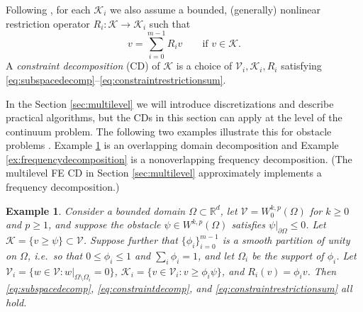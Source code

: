 \documentclass[letterpaper,final,12pt,reqno]{amsart}
\theoremstyle{cstyle}
\theoremstyle{cstyle*}
\theoremstyle{dstyle}
\newtheorem{example}[theorem]{Example}
\numberwithin{equation}{section}
\numberwithin{figure}{section}
\numberwithin{table}{section}
\numberwithin{theorem}{section}
\newcommand{\RR}{\mathbb{R}}
\newcommand{\cK}{\mathcal{K}}
\newcommand{\cV}{\mathcal{V}}
\begin{document}
Following \cite{Tai2003}, for each $\cK_i$ we also assume a bounded, (generally) nonlinear restriction operator $R_i : \cK \to \cK_i$ such that
\begin{equation}
v = \sum_{i=0}^{m-1} R_i v \qquad \text{if } v \in \cK.  \label{eq:constraintrestrictionsum}
\end{equation}
A \emph{constraint decomposition} (CD) of $\cK$ is a choice of $\cV_i,\cK_i,R_i$ satisfying \eqref{eq:subspacedecomp}--\eqref{eq:constraintrestrictionsum}.

In the Section \ref{sec:multilevel} we will introduce discretizations and describe practical algorithms, but the CDs in this section can apply at the level of the continuum problem.  The following two examples illustrate this for obstacle problems \cite{GraeserKornhuber2009}.   Example \ref{ex:domaindecomposition} is an overlapping domain decomposition and Example \ref{ex:frequencydecomposition} is a nonoverlapping frequency decomposition.  (The multilevel FE CD in Section \ref{sec:multilevel} approximately implements a frequency decomposition.)

\begin{example}  \label{ex:domaindecomposition}  Consider a bounded domain $\Omega \subset \RR^d$, let $\cV = W_0^{k,p}(\Omega)$ for $k\ge 0$ and $p\ge 1$, and suppose the obstacle $\psi \in W^{k,p}(\Omega)$ satisfies $\psi|_{\partial \Omega} \le 0$.  Let $\cK = \{v \ge \psi\} \subset \cV$.  Suppose further that $\{\phi_i\}_{i=0}^{m-1}$ is a smooth partition of unity on $\Omega$, i.e.~so that $0 \le \phi_i\le 1$ and $\sum_i \phi_i = 1$, and let $\Omega_i$ be the support of $\phi_i$.  Let $\cV_i = \{w \in \cV:w|_{\Omega \setminus \Omega_i} =0 \}$, $\cK_i = \{v \in \cV_i: v \ge \phi_i \psi\}$, and $R_i(v) = \phi_i v$.  Then \eqref{eq:subspacedecomp}, \eqref{eq:constraintdecomp}, and \eqref{eq:constraintrestrictionsum} all hold.
\end{example}

\end{document}
